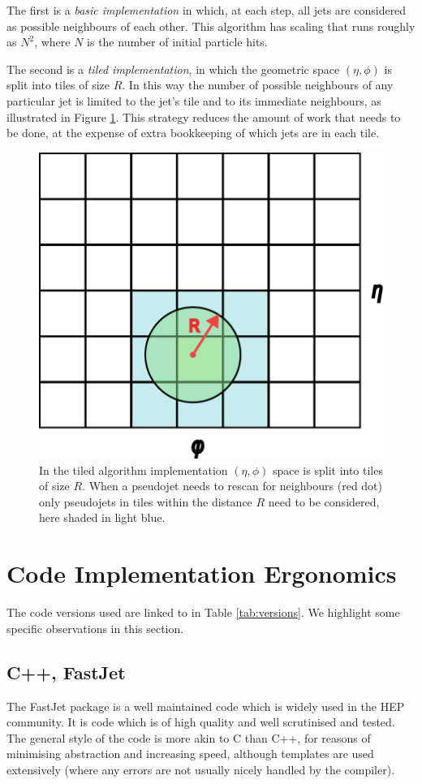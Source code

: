 \documentclass{webofc}
\begin{document}
The first is a \emph{basic implementation} in which, at each step, all jets are
considered as possible neighbours of each other. This algorithm has scaling that
runs roughly as $N^2$, where $N$ is the number of initial particle hits.

The second is a \emph{tiled implementation}, in which the geometric space
$(\eta, \phi)$ is split into tiles of size $R$. In this way the number of
possible neighbours of any particular jet is limited to the jet's tile and to
its immediate neighbours, as illustrated in Figure \ref{fig:tiledimp}. This
strategy reduces the amount of work that needs to be done, at the expense of
extra bookkeeping of which jets are in each tile.

\begin{figure}[h]
  \begin{center}
    \includegraphics[width=0.4\linewidth]{tiled-algorithm.pdf}
    \caption{In the tiled algorithm implementation $(\eta,\phi)$ space is split into tiles of size $R$. When a pseudojet needs to rescan for neighbours (red dot) only pseudojets in tiles within the distance $R$ need to be considered, here shaded in light blue.}
    \label{fig:tiledimp}
  \end{center}
\end{figure}

\section{Code Implementation Ergonomics}
\label{sec:ergonomics}

The code versions used are linked to in Table \ref{tab:versions}. We highlight
some specific observations in this section.

\subsection{C++, FastJet}
\label{sec:cpp-ergonomics}

The FastJet package is a well maintained code which is widely used in the HEP
community. It is code which is of high quality and well scrutinised and tested.
The general style of the code is more akin to C than C++, for reasons of
minimising abstraction and increasing speed, although templates are used
extensively (where any errors are not usually nicely handled by the compiler).
\end{document}
